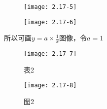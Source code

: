 \begin{figure}[H] %
	\begin{minipage}{\linewidth}
		\texttt{[image: 2.17-5]}
	\end{minipage}
\end{figure}


\begin{figure}[H] %
	\begin{minipage}{\linewidth}
		\texttt{[image: 2.17-6]}
	\end{minipage}
\end{figure}



所以可画$y=a\times \frac{1}{x}$图像，令$a=1$


		\begin{figure}[H] %
	\begin{minipage}{\linewidth}
		\texttt{[image: 2.17-7]}
	\end{minipage}
	\caption*{表2} %
\end{figure}

\begin{figure}[H] %
	\begin{minipage}{\linewidth}
		\texttt{[image: 2.17-8]}
	\end{minipage}
	\caption*{图2} %
\end{figure}


